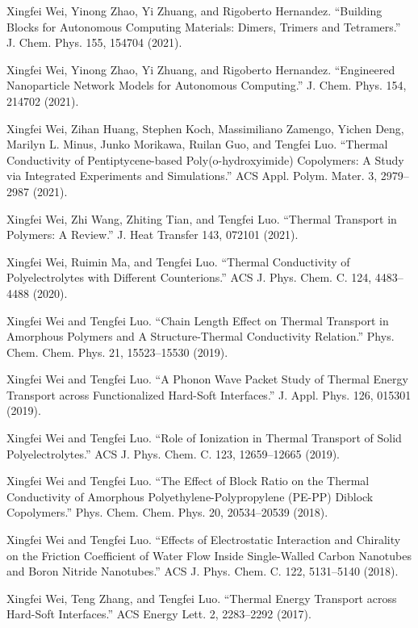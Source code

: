   \item {Xingfei Wei, Yinong Zhao, Yi Zhuang, and Rigoberto Hernandez. 
``Building Blocks for Autonomous Computing Materials: Dimers, Trimers and Tetramers.''
J. Chem. Phys. 155, 154704 (2021).}
  \item {Xingfei Wei, Yinong Zhao, Yi Zhuang, and Rigoberto Hernandez. 
``Engineered Nanoparticle Network Models for Autonomous Computing.''
J. Chem. Phys. 154, 214702 (2021).}
  \item {Xingfei Wei, Zihan Huang, Stephen Koch, Massimiliano Zamengo, Yichen Deng, Marilyn L. Minus, Junko Morikawa, Ruilan Guo, and Tengfei Luo. 
``Thermal Conductivity of Pentiptycene-based Poly(o-hydroxyimide) Copolymers: A Study via Integrated Experiments and Simulations.'' 
ACS Appl. Polym. Mater. 3, 2979--2987 (2021).}
  \item {Xingfei Wei, Zhi Wang, Zhiting Tian, and Tengfei Luo. 
``Thermal Transport in Polymers: A Review.'' 
J. Heat Transfer 143, 072101 (2021).}
  \item {Xingfei Wei, Ruimin Ma, and Tengfei Luo. 
``Thermal Conductivity of Polyelectrolytes with Different Counterions.'' 
ACS J. Phys. Chem. C. 124, 4483--4488 (2020).}
  \item {Xingfei Wei and Tengfei Luo. 
``Chain Length Effect on Thermal Transport in Amorphous Polymers and A Structure-Thermal Conductivity Relation.''
Phys. Chem. Chem. Phys. 21, 15523--15530 (2019).}
  \item {Xingfei Wei and Tengfei Luo. 
``A Phonon Wave Packet Study of Thermal Energy Transport across Functionalized Hard-Soft Interfaces.'' 
J. Appl. Phys. 126, 015301 (2019).}
  \item {Xingfei Wei and Tengfei Luo. 
``Role of Ionization in Thermal Transport of Solid Polyelectrolytes.'' 
ACS J. Phys. Chem. C. 123, 12659--12665 (2019).}
  \item {Xingfei Wei and Tengfei Luo. 
``The Effect of Block Ratio on the Thermal Conductivity of Amorphous Polyethylene-Polypropylene (PE-PP) Diblock Copolymers.''
Phys. Chem. Chem. Phys. 20, 20534--20539 (2018).}
  \item {Xingfei Wei and Tengfei Luo. 
``Effects of Electrostatic Interaction and Chirality on the Friction Coefficient of Water Flow Inside Single-Walled Carbon Nanotubes and Boron Nitride Nanotubes.''
ACS J. Phys. Chem. C. 122, 5131--5140 (2018).}
  \item {Xingfei Wei, Teng Zhang, and Tengfei Luo. 
``Thermal Energy Transport across Hard-Soft Interfaces.''
ACS Energy Lett. 2, 2283--2292 (2017).}
